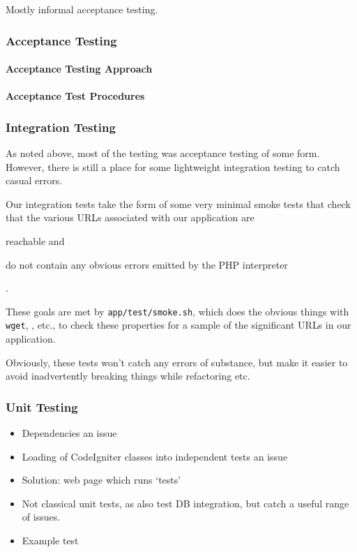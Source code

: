 Mostly informal acceptance testing.

\subsubsection{Acceptance Testing}

\paragraph{Acceptance Testing Approach}

\paragraph{Acceptance Test Procedures}

\subsubsection{Integration Testing}

As noted above, most of the testing was acceptance testing of some
form. However, there is still a place for some lightweight integration
testing to catch casual errors.

Our integration tests take the form of some very minimal smoke tests
that check that the various URLs associated with our application are
\begin{inparaenum}
\item reachable and
\item do not contain any obvious errors emitted by the PHP interpreter
\end{inparaenum}.

These goals are met by \verb!app/test/smoke.sh!, which does the
obvious things with \texttt{wget}, , etc., to check these
properties for a sample of the significant URLs in our application.

Obviously, these tests won't catch any errors of substance, but make
it easier to avoid inadvertently breaking things while refactoring
etc.

\subsubsection{Unit Testing}

\begin{itemize}
\item Dependencies an issue
\item Loading of CodeIgniter classes into independent tests an issue
\item Solution: web page which runs `tests'
\item Not classical unit tests, as also test DB integration, but catch
  a useful range of issues.
\item Example test
\end{itemize}
